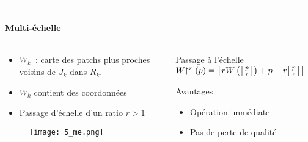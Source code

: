 \documentclass[aspectratio=169, 22pt]{beamer}
\DeclarePairedDelimiter\floor{\lfloor}{\rfloor}
\begin{document}
\begin{frame}{\secname~- \subsecname}
  \framesubtitle{Multi-échelle}
  \begin{columns}
    \begin{column}{0.5\linewidth}
      \begin{itemize}
      \item $W_k$~: carte des patchs plus proches voisins de $J_k$ dans $R_k$.
      \item $W_k$ contient des \alert{coordonnées}
      \item Passage d'échelle d'un ratio $r > 1$
      \end{itemize}
      \begin{figure}
        \texttt{[image: 5\_me.png]}
      \end{figure}

    \end{column}
    \begin{column}{0.5\linewidth}
      \begin{block}{Passage à l'échelle}
        \centering
        $W\!\!\uparrow^r(p) = \floor*{rW\left(\floor*{\frac{p}{r}}\right) + p - r\floor*{\frac{p}{r}}}$
      \end{block}
      \vspace{1em}
      \begin{exampleblock}{Avantages}
        \begin{itemize}
        \item Opération immédiate
        \item Pas de perte de qualité
        \end{itemize}
      \end{exampleblock}
    \end{column}
  \end{columns}
\end{frame}
\end{document}
